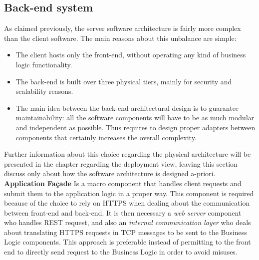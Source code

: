 \subsection{Back-end system}
As claimed previously, the server software architecture is fairly more complex than the client software. The main reasons about this unbalance are simple:
\begin{itemize}
    \item The client hosts only the front-end, without operating any kind of business logic functionality.
    \item The back-end is built over three physical tiers, mainly for security and scalability reasons.
    \item The main idea between the back-end architectural design is to guarantee maintainability: all the software components will have to be as much 
          modular and independent as possible. Thus requires to design proper adapters between components that certainly increases the overall complexity.
\end{itemize}

Further information about this choice regarding the physical architecture will be presented in the chapter regarding the deployment view, leaving this section
discuss only about how the software architecture is designed a-priori. \\

\textbf{Application Façade} 
        Is a macro component that handles client requests and submit them to the application logic in a proper way. This component is required because
        of the choice to rely on HTTPS when dealing about the communication between front-end and back-end. It is then necessary a \emph{web server} component who handles
        REST request, and also an \emph{internal communication layer} who deals about translating HTTPS requests in TCP messages to be sent to the Business Logic components.
        This approach is preferable instead of permitting to the front end to directly send request to the Business Logic in order to avoid misuses. \\
        
